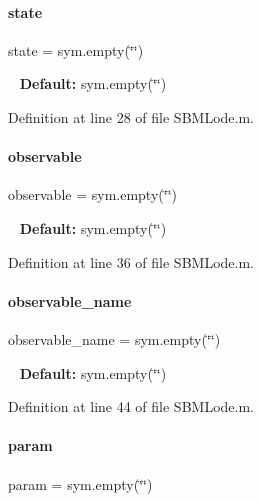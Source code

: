 \paragraph{\texorpdfstring{state}{state}}
{\footnotesize\ttfamily state = sym.\+empty(\char`\"{}\char`\"{})}

~\newline
{\bfseries Default\+:} sym.\+empty(\char`\"{}\char`\"{}) 

Definition at line 28 of file S\+B\+M\+Lode.\+m.

\mbox{\label{class_s_b_m_lode_a072b6f6192ac4f40e74b69f901ecdfef}} 
\paragraph{\texorpdfstring{observable}{observable}}
{\footnotesize\ttfamily observable = sym.\+empty(\char`\"{}\char`\"{})}

~\newline
{\bfseries Default\+:} sym.\+empty(\char`\"{}\char`\"{}) 

Definition at line 36 of file S\+B\+M\+Lode.\+m.

\mbox{\label{class_s_b_m_lode_a6e638e3379dc2d099b3cf3083246fbe0}} 
\paragraph{\texorpdfstring{observable\+\_\+name}{observable\_name}}
{\footnotesize\ttfamily observable\+\_\+name = sym.\+empty(\char`\"{}\char`\"{})}

~\newline
{\bfseries Default\+:} sym.\+empty(\char`\"{}\char`\"{}) 

Definition at line 44 of file S\+B\+M\+Lode.\+m.

\mbox{\label{class_s_b_m_lode_a51f20d6b1b54a2eee3be0e8adc96a0ae}} 
\paragraph{\texorpdfstring{param}{param}}
{\footnotesize\ttfamily param = sym.\+empty(\char`\"{}\char`\"{})}

